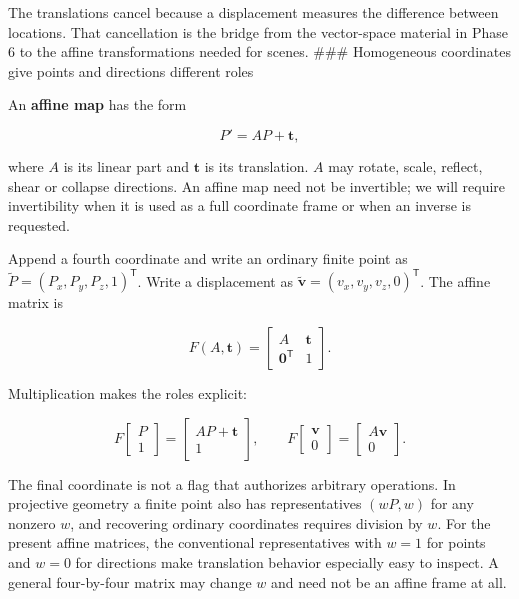The translations cancel because a displacement measures the difference between locations. That cancellation is the bridge from the vector-space material in Phase 6 to the affine transformations needed for scenes. \#\#\# Homogeneous coordinates give points and directions different roles

An \textbf{affine map} has the form

\[
P'=AP+\mathbf t,
\]

where \(A\) is its linear part and \(\mathbf t\) is its translation. \(A\) may rotate, scale, reflect, shear or collapse directions. An affine map need not be invertible; we will require invertibility when it is used as a full coordinate frame or when an inverse is requested.

Append a fourth coordinate and write an ordinary finite point as \(\widetilde P=(P_x,P_y,P_z,1)^{\mathsf T}\). Write a displacement as \(\widetilde{\mathbf v}=(v_x,v_y,v_z,0)^{\mathsf T}\). The affine matrix is

\[
F(A,\mathbf t)=
\begin{bmatrix}
A&\mathbf t\\
\mathbf0^{\mathsf T}&1
\end{bmatrix}.
\]

Multiplication makes the roles explicit:

\[
F\begin{bmatrix}P\\1\end{bmatrix}
=\begin{bmatrix}AP+\mathbf t\\1\end{bmatrix},
\qquad
F\begin{bmatrix}\mathbf v\\0\end{bmatrix}
=\begin{bmatrix}A\mathbf v\\0\end{bmatrix}.
\]

The final coordinate is not a flag that authorizes arbitrary operations. In projective geometry a finite point also has representatives \((wP,w)\) for any nonzero \(w\), and recovering ordinary coordinates requires division by \(w\). For the present affine matrices, the conventional representatives with \(w=1\) for points and \(w=0\) for directions make translation behavior especially easy to inspect. A general four-by-four matrix may change \(w\) and need not be an affine frame at all.

